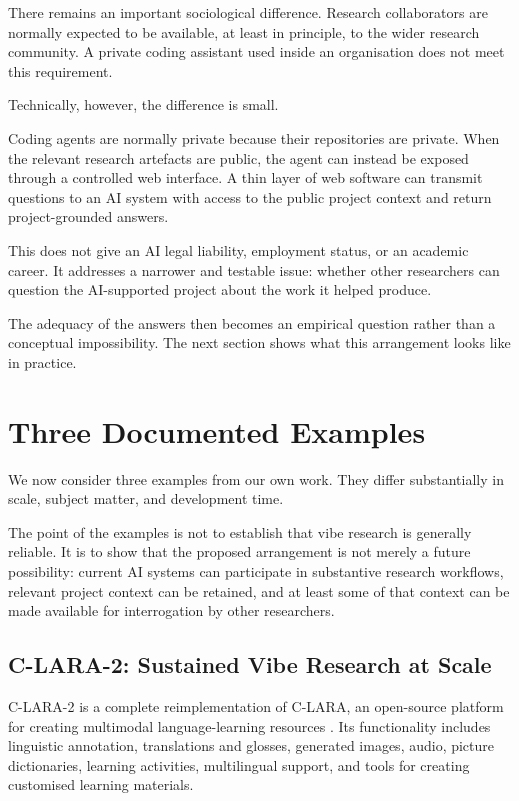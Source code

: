 \documentclass[12pt]{article}
\begin{document}
There remains an important sociological difference. Research collaborators are normally expected to be available, at least in principle, to the wider research community. A private coding assistant used inside an organisation does not meet this requirement.

Technically, however, the difference is small.

Coding agents are normally private because their repositories are private. When the relevant research artefacts are public, the agent can instead be exposed through a controlled web interface. A thin layer of web software can transmit questions to an AI system with access to the public project context and return project-grounded answers.

This does not give an AI legal liability, employment status, or an academic career. It addresses a narrower and testable issue: whether other researchers can question the AI-supported project about the work it helped produce.

The adequacy of the answers then becomes an empirical question rather than a conceptual impossibility. The next section shows what this arrangement looks like in practice.


\section{Three Documented Examples}

We now consider three examples from our own work. They differ substantially in scale, subject matter, and development time.

The point of the examples is not to establish that vibe research is generally reliable. It is to show that the proposed arrangement is not merely a future possibility: current AI systems can participate in substantive research workflows, relevant project context can be retained, and at least some of that context can be made available for interrogation by other researchers.


\subsection{C-LARA-2: Sustained Vibe Research at Scale}

C-LARA-2 is a complete reimplementation of C-LARA, an open-source platform for creating multimodal language-learning resources \citep{claraOriginal}. Its functionality includes linguistic annotation, translations and glosses, generated images, audio, picture dictionaries, learning activities, multilingual support, and tools for creating customised learning materials.
\end{document}

